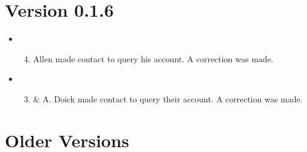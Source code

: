 \documentclass[letterpaper,10pt,openany,oneside,english]{sphinxmanual}
\begin{document}
\section{Version 0.1.6}
\label{\detokenize{releasenotes:version-0-1-6}}\begin{itemize}
\item {} \begin{enumerate}
\setcounter{enumi}{3}
\item {} 
Allen made contact to query his account. A correction was made.

\end{enumerate}

\item {} \begin{enumerate}
\setcounter{enumi}{2}
\item {} 
\& A. Doick made contact to query their account. A correction was made.

\end{enumerate}

\end{itemize}


\section{Older Versions}
\label{\detokenize{releasenotes:older-versions}}
\end{document}
